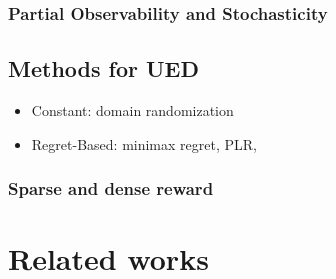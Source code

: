 \subsubsection{Partial Observability and Stochasticity}


\subsection{Methods for UED}
\begin{itemize}
    \item Constant: domain randomization \cite{}
    \item Regret-Based:  \cite{dennis2020} minimax regret, \cite{parkerholder2023ACCEL} PLR, \cite{JiangPLR2021}
    
\end{itemize}

\subsubsection{Sparse and dense reward}


\section{Related works}